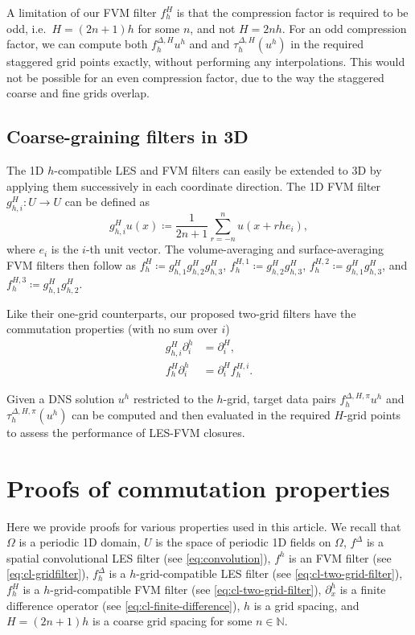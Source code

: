 \documentclass[preprint,twocolumn,5p]{elsarticle}
\begin{document}
A limitation of our FVM filter $f^H_h$ is that
the compression factor is required to be odd, i.e.\
$H = (2 n + 1) h$ for some $n$, and not $H = 2 n h$.
For an odd compression factor, we can compute both
$f^{\Delta, H}_h u^h$ and and $\tau^{\Delta, H}_h(u^h)$ in the required
staggered grid points exactly, without performing any interpolations.
This would not be possible for an even compression factor, due to the way the
staggered coarse and fine grids overlap.

\subsection{Coarse-graining filters in 3D}

The 1D $h$-compatible LES and FVM filters can easily be extended to 3D
by applying them successively in each coordinate direction.
The 1D FVM filter 
$g^H_{h, i} : U \to U$ can be defined as
\begin{equation}
    g^H_{h, i} u(x)
    \coloneq \frac{1}{2 n + 1} \sum_{r = -n}^n u(x + r h e_i),
\end{equation}
where $e_i$ is the $i$-th unit vector.
The volume-averaging and surface-averaging FVM filters then follow as
$f^H_h \coloneq g^H_{h, 1} g^H_{h, 2} g^H_{h, 3}$,
$f^{H, 1}_h \coloneq g^H_{h, 2} g^H_{h, 3}$, 
$f^{H, 2}_h \coloneq g^H_{h, 1} g^H_{h, 3}$, and
$f^{H, 3}_h \coloneq g^H_{h, 1} g^H_{h, 2}$.

Like their one-grid counterparts, our proposed two-grid filters have the
commutation properties (with no sum over $i$)
\begin{align}
    g^H_{h, i} \partial^h_i & = \partial^H_i, \\
    f^H_h \partial^h_i & = \partial^H_i f^{H, i}_h.
\end{align}


Given a DNS solution $u^h$ restricted to the $h$-grid, target data pairs
$f^{\Delta, H, \pi}_h u^h$ and $\tau^{\Delta, H, \pi}_h(u^h)$ can be computed and then
evaluated in the required $H$-grid points to assess the performance of LES-FVM
closures.


\section{Proofs of commutation properties} \label{sec:proofs}

Here we provide proofs for various properties used in this article.
We recall that $\Omega$ is a periodic 1D domain,
$U$ is the space of periodic 1D fields on $\Omega$,
$f^\Delta$ is a spatial convolutional LES filter (see \cref{eq:convolution}),
$f^h$ is an FVM filter (see \cref{eq:cl-gridfilter}),
$f^\Delta_h$ is a $h$-grid-compatible LES filter
(see \cref{eq:cl-two-grid-filter}),
$f^H_h$ is a $h$-grid-compatible FVM filter (see \cref{eq:cl-two-grid-filter}),
$\partial^h_x$ is a finite difference operator (see \cref{eq:cl-finite-difference}),
$h$ is a grid spacing, and
$H = (2 n + 1) h$ is a coarse grid spacing for some $n \in \mathbb{N}$.
\end{document}

